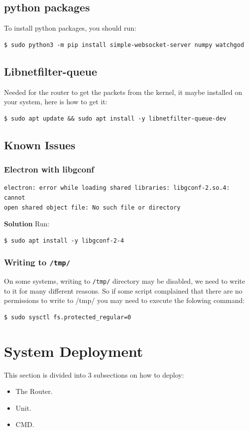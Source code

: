 \subsection{python packages}
To install python packages, you should run:
\begin{verbatim}
$ sudo python3 -m pip install simple-websocket-server numpy watchgod
\end{verbatim}

\subsection{Libnetfilter-queue}
Needed for the router to get the packets from the kernel, it maybe installed on your system, here is how to get it:
\begin{verbatim}
$ sudo apt update && sudo apt install -y libnetfilter-queue-dev
\end{verbatim}

\subsection{Known Issues}
\subsubsection{Electron with libgconf}
\begin{verbatim}
electron: error while loading shared libraries: libgconf-2.so.4: cannot
open shared object file: No such file or directory    
\end{verbatim}
\textbf{Solution} Run:
\begin{verbatim}
$ sudo apt install -y libgconf-2-4
\end{verbatim}

\subsubsection{Writing to \texttt{/tmp/}}
On some systems, writing to \texttt{/tmp/} directory may be disabled, we need to write to it for many different reasons.
So if some script complained that there are no permissions to write to /tmp/ you may need to execute the folowing command:
\begin{verbatim}
$ sudo sysctl fs.protected_regular=0
\end{verbatim}

\section{System Deployment}
This section is divided into 3 subsections on how to deploy:
\begin{itemize}[itemsep=1pt, topsep=5pt]
    \item The Router.
    \item Unit.
    \item CMD.
\end{itemize}

